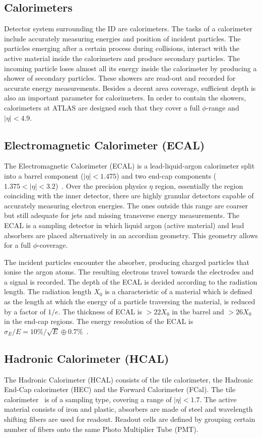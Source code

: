 \subsection{Calorimeters}
Detector system surrounding the ID are calorimeters. The tasks of a calorimeter include accurately measuring energies and position of incident
particles. The particles emerging after a certain process during collisions, interact with the active material inside the calorimeters and produce secondary particles. The incoming
particle loses almost all its energy inside the calorimeter by producing a shower of secondary particles. These showers are read-out and recorded for accurate energy measurements. 
Besides a decent area coverage, sufficient depth is also an important parameter for calorimeters. In order to contain the showers, calorimeters at ATLAS are designed such that they cover a 
full $\phi$-range and $|\eta|<4.9$.  

\subsection*{Electromagnetic Calorimeter (ECAL)}
The Electromagnetic Calorimeter (ECAL) is a lead-liquid-argon calorimeter split into a barrel component ($|\eta|<1.475$) and two end-cap components 
($1.375 < |\eta| < 3.2$)~\cite{TheATLASCollaboration_2008}. Over the precision physics $\eta$ region, essentially the region coinciding with the inner detector, there are highly granular
detectors capable of accurately measuring electron energies. The ones outside this range are coarser but still adequate for jets and missing transverse energy measurements.
The ECAL is a sampling detector in which liquid argon (active material) and lead absorbers are placed alternatively in an accordian geometry. This geometry allows for a full 
$\phi$-coverage. 

The incident particles encounter the absorber, producing charged particles that ionise the argon atoms. The resulting electrons travel towards the electrodes and a
signal is recorded. The depth of the ECAL is decided according to the radiation length. The radiation length $X_0$ is a characteristic of a material which is defined as 
the length at which the energy of a particle traversing the material, is reduced by a factor of $1/e$. The thickness of ECAL is $> 22 X_0$ in the barrel and $> 26 X_0$ in the end-cap
regions. The energy resolution of the ECAL is $\sigma_E/E = 10\%/\sqrt{E} \oplus 0.7\%$~\cite{CERN-LHCC-2017-018}.

\subsection*{Hadronic Calorimeter (HCAL)}
The Hadronic Calorimeter (HCAL) consists of the tile calorimeter, the Hadronic End-Cap calorimeter (HEC) and the Forward Calorimeter (FCal). The tile calorimeter~\cite{Francavilla_2012} is of a sampling
type, covering a range of $|\eta|<1.7$. The active material consists of iron and plastic, absorbers are made of steel and wavelength shifting fibers are used for readout.
Readout cells are defined by grouping certain number of fibers onto the same Photo Multiplier Tube (PMT). 

